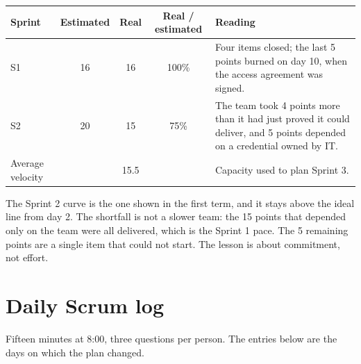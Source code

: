 \documentclass[10pt,a4paper]{article}
\begin{document}
\vspace{-8pt}
{\small
\begin{tabularx}{\linewidth}{@{}l c c c L@{}}
\toprule
Sprint & Estimated & Real & Real / estimated & Reading \\
\midrule
S1 & 16 & 16 & 100\% & Four items closed; the last 5 points burned on day 10, when the access agreement was signed. \\
S2 & 20 & 15 & 75\% & The team took 4 points more than it had just proved it could deliver, and 5 points depended on a credential owned by IT. \\
\midrule
Average velocity & & 15.5 & & Capacity used to plan Sprint 3. \\
\bottomrule
\end{tabularx}}

The Sprint 2 curve is the one shown in the first term, and it stays above the ideal line from day 2. The shortfall is
not a slower team: the 15 points that depended only on the team were all delivered, which is the Sprint 1 pace.
The 5 remaining points are a single item that could not start. The lesson is about commitment, not effort.

\section{Daily Scrum log}
Fifteen minutes at 8:00, three questions per person. The entries below are the days on which the plan changed.
\end{document}
